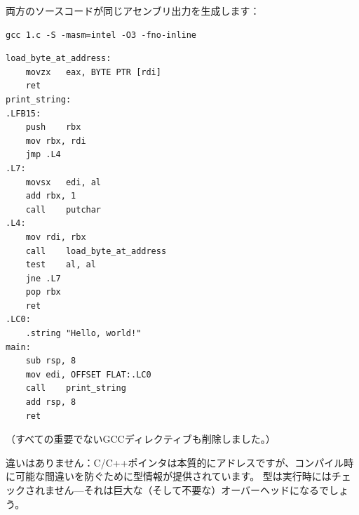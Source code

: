 両方のソースコードが同じアセンブリ出力を生成します：

\begin{lstlisting}
gcc 1.c -S -masm=intel -O3 -fno-inline
\end{lstlisting}

\begin{lstlisting}[style=customasmx86]
load_byte_at_address:
	movzx	eax, BYTE PTR [rdi]
	ret
print_string:
.LFB15:
	push	rbx
	mov	rbx, rdi
	jmp	.L4
.L7:
	movsx	edi, al
	add	rbx, 1
	call	putchar
.L4:
	mov	rdi, rbx
	call	load_byte_at_address
	test	al, al
	jne	.L7
	pop	rbx
	ret
.LC0:
	.string	"Hello, world!"
main:
	sub	rsp, 8
	mov	edi, OFFSET FLAT:.LC0
	call	print_string
	add	rsp, 8
	ret
\end{lstlisting}

（すべての重要でないGCCディレクティブも削除しました。）

違いはありません：C/C++ポインタは本質的にアドレスですが、コンパイル時に可能な間違いを防ぐために型情報が提供されています。
型は実行時にはチェックされません---それは巨大な（そして不要な）オーバーヘッドになるでしょう。